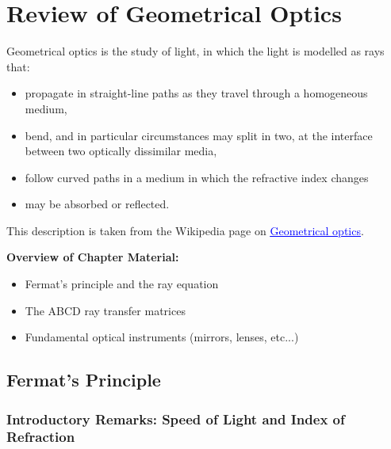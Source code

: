 \documentclass[11pt, a4paper]{article}
\begin{document}
\pagestyle{empty}  %

\tableofcontents

\newpage


\pagestyle{fancy}
\section{Review of Geometrical Optics}
Geometrical optics is the study of light, in which the light is modelled as rays that:
\begin{itemize}
    \item propagate in straight-line paths as they travel through a homogeneous medium,
    \item bend, and in particular circumstances may split in two, at the interface between two optically dissimilar media,
    \item follow curved paths in a medium in which the refractive index changes
    \item may be absorbed or reflected.
\end{itemize}
This description is taken from the Wikipedia page on 
 \href{https://en.wikipedia.org/wiki/Geometrical_optics}{\textcolor{blue}{\underline{Geometrical optics}}}.

 \vspace{2mm}
\textbf{Overview of Chapter Material:}
\begin{itemize}
    \item Fermat's principle and the ray equation
    \item The ABCD ray transfer matrices
    \item Fundamental optical instruments (mirrors, lenses, etc...)
\end{itemize}

\subsection{Fermat's Principle}

\subsubsection{Introductory Remarks: Speed of Light and Index of Refraction}
\end{document}
